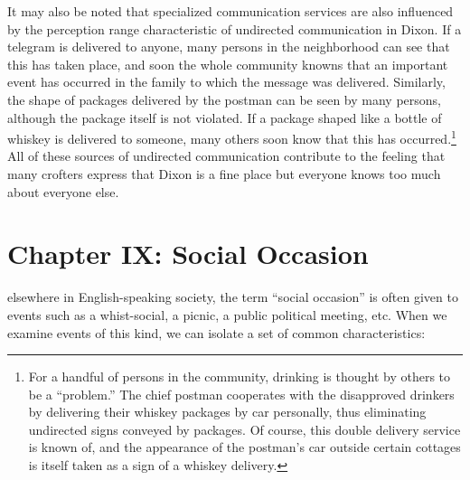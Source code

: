 \documentclass[openany,nobib]{tufte-book}
\let\oldchapter\chapter
\def\chapter{%
  \setcounter{footnote}{0}%
  \oldchapter
}
\begin{document}
It may also be noted that specialized communication services are also
influenced by the perception range characteristic of undirected
communication in Dixon. If a telegram is delivered to anyone, many
persons in the neighborhood can see that this has taken place, and soon
the whole community knowns that an important event has occurred in the
family to which the message was delivered. Similarly, the shape of
packages delivered by the postman can be seen by many persons, although
the package itself is not violated. If a package shaped like a bottle of
whiskey is delivered to someone, many others soon know that this has
occurred.\footnote{For a handful of persons in the community, drinking
  is thought by others to be a ``problem.'' The chief postman cooperates
  with the disapproved drinkers by delivering their whiskey packages by
  car personally, thus eliminating undirected signs conveyed by
  packages. Of course, this double delivery service is known of, and the
  appearance of the postman's car outside certain cottages is itself
  taken as a sign of a whiskey delivery.} All of these sources of
undirected communication contribute to the feeling that many crofters
express that Dixon is a fine place but everyone knows too much about
everyone else.

\chapter[CHAPTER IX: SOCIAL OCCASION]{Chapter IX: Social Occasion}
\label{ch:Chapter IX: Social Occasion}

elsewhere in English-speaking society, the
term ``social occasion'' is often given to events such as a
whist-social, a picnic, a public political meeting, etc. When we examine
events of this kind, we can isolate a set of common characteristics:

\enlargethispage{\baselineskip}
\end{document}
